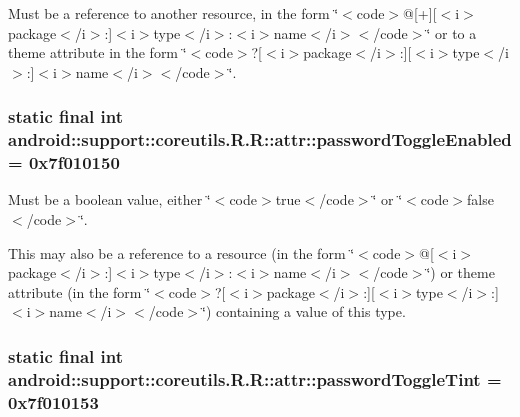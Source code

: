 Must be a reference to another resource, in the form \char`\"{}$<$code$>$@\mbox{[}+\mbox{]}\mbox{[}$<$i$>$package$<$/i$>$:\mbox{]}$<$i$>$type$<$/i$>$:$<$i$>$name$<$/i$>$$<$/code$>$\char`\"{} or to a theme attribute in the form \char`\"{}$<$code$>$?\mbox{[}$<$i$>$package$<$/i$>$:\mbox{]}\mbox{[}$<$i$>$type$<$/i$>$:\mbox{]}$<$i$>$name$<$/i$>$$<$/code$>$\char`\"{}. \hypertarget{classandroid_1_1support_1_1coreutils_1_1_r_1_1attr_14163089d3eda437a792329232773098}{
\subsubsection[{passwordToggleEnabled}]{\setlength{\rightskip}{0pt plus 5cm}static final int android::support::coreutils.R.R::attr::passwordToggleEnabled = 0x7f010150}}
\label{classandroid_1_1support_1_1coreutils_1_1_r_1_1attr_14163089d3eda437a792329232773098}


Must be a boolean value, either \char`\"{}$<$code$>$true$<$/code$>$\char`\"{} or \char`\"{}$<$code$>$false$<$/code$>$\char`\"{}. 

This may also be a reference to a resource (in the form \char`\"{}$<$code$>$@\mbox{[}$<$i$>$package$<$/i$>$:\mbox{]}$<$i$>$type$<$/i$>$:$<$i$>$name$<$/i$>$$<$/code$>$\char`\"{}) or theme attribute (in the form \char`\"{}$<$code$>$?\mbox{[}$<$i$>$package$<$/i$>$:\mbox{]}\mbox{[}$<$i$>$type$<$/i$>$:\mbox{]}$<$i$>$name$<$/i$>$$<$/code$>$\char`\"{}) containing a value of this type. \hypertarget{classandroid_1_1support_1_1coreutils_1_1_r_1_1attr_5c66dc2ab14aeb48bec47f94d009af8d}{
\subsubsection[{passwordToggleTint}]{\setlength{\rightskip}{0pt plus 5cm}static final int android::support::coreutils.R.R::attr::passwordToggleTint = 0x7f010153}}
\label{classandroid_1_1support_1_1coreutils_1_1_r_1_1attr_5c66dc2ab14aeb48bec47f94d009af8d}


